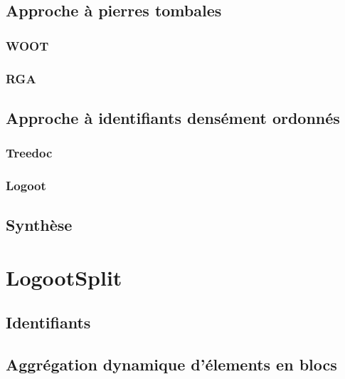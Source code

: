 \documentclass[12pt]{thesul}
\theoremstyle{definition}
\begin{document}
\subsection{Approche à pierres tombales}

\subsubsection{WOOT}


\subsubsection{\acl{RGA}}


\subsection{Approche à identifiants densément ordonnés}

\subsubsection{Treedoc}


\subsubsection{Logoot}



\subsection{Synthèse}


\section{LogootSplit}


\subsection{Identifiants}


\subsection{Aggrégation dynamique d'élements en blocs}

\end{document}
